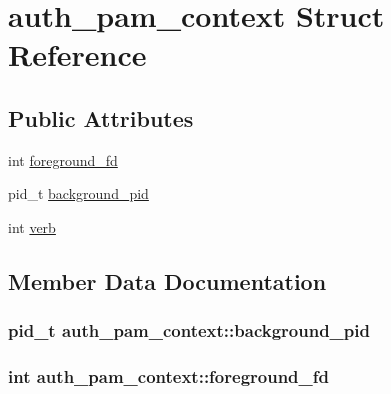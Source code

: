 \hypertarget{structauth__pam__context}{}\section{auth\+\_\+pam\+\_\+context Struct Reference}
\label{structauth__pam__context}
\subsection*{Public Attributes}
\begin{DoxyCompactItemize}
\item 
int \hyperlink{structauth__pam__context_a4d5e6779955ef28009010c65056d6cf7}{foreground\+\_\+fd}
\item 
pid\+\_\+t \hyperlink{structauth__pam__context_ae8960fe66401e5c92bde3ac67356927e}{background\+\_\+pid}
\item 
int \hyperlink{structauth__pam__context_a443a725256c636e197fe19f1bc5d801f}{verb}
\end{DoxyCompactItemize}


\subsection{Member Data Documentation}
\hypertarget{structauth__pam__context_ae8960fe66401e5c92bde3ac67356927e}{}
\subsubsection[{background\+\_\+pid}]{\setlength{\rightskip}{0pt plus 5cm}pid\+\_\+t auth\+\_\+pam\+\_\+context\+::background\+\_\+pid}\label{structauth__pam__context_ae8960fe66401e5c92bde3ac67356927e}
\hypertarget{structauth__pam__context_a4d5e6779955ef28009010c65056d6cf7}{}
\subsubsection[{foreground\+\_\+fd}]{\setlength{\rightskip}{0pt plus 5cm}int auth\+\_\+pam\+\_\+context\+::foreground\+\_\+fd}\label{structauth__pam__context_a4d5e6779955ef28009010c65056d6cf7}
\hypertarget{structauth__pam__context_a443a725256c636e197fe19f1bc5d801f}{}
